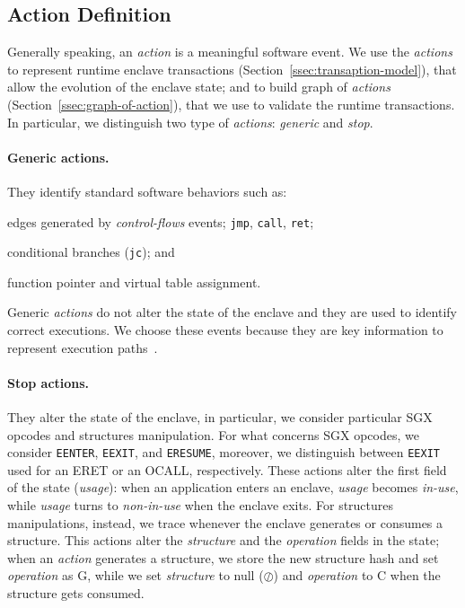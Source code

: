 \subsection{Action Definition}
\label{ssec:actions-definition}

Generally speaking, an \emph{action} is a meaningful software event.
We use the \emph{actions} to represent runtime enclave transactions
(Section~\ref{ssec:transaption-model}), that allow the evolution of the 
enclave state; and to build graph of \emph{actions} 
(Section~\ref{ssec:graph-of-action}), that we use to validate the runtime 
transactions.
In particular, we distinguish two type of \emph{actions}: \emph{generic} and 
\emph{stop}.

\paragraph{Generic actions.}
They identify standard software behaviors such as:
\begin{enumerate*}[label=(\roman*)]
	\item edges generated by \emph{control-flows} events; \eg \texttt{jmp}, 
	\texttt{call}, \texttt{ret};
	\item conditional branches (\eg \texttt{jc}); and
	\item function pointer and virtual table assignment.
\end{enumerate*}
Generic \emph{actions} do not alter the state of the enclave and they are 
used to identify correct executions.
We choose these events because they are key information to represent
execution paths~\citep{scarr,hu2018enforcing,kleen2015intel,7924286,9051250}.

\paragraph{Stop actions.}
They alter the state of the enclave, in particular, we consider particular SGX 
opcodes and structures manipulation.
For what concerns SGX opcodes, we consider \texttt{EENTER}, \texttt{EEXIT}, and 
\texttt{ERESUME}, moreover, we distinguish between \texttt{EEXIT} used for an 
ERET or an OCALL, respectively. These actions alter the first field of the 
state (\ie \emph{usage}): when an application enters an enclave, \emph{usage} 
becomes \emph{in-use}, while \emph{usage} turns to \emph{non-in-use} when the 
enclave exits.
For structures manipulations, instead, we trace whenever the enclave 
generates or consumes a structure. This actions alter the \emph{structure} and 
the	\emph{operation} fields in the state; \ie when an \emph{action} generates a 
structure, we store the new structure hash and set \emph{operation} as G, while 
we set \emph{structure} to null (\ie $\oslash$) and \emph{operation} to C when 
the structure gets consumed.

